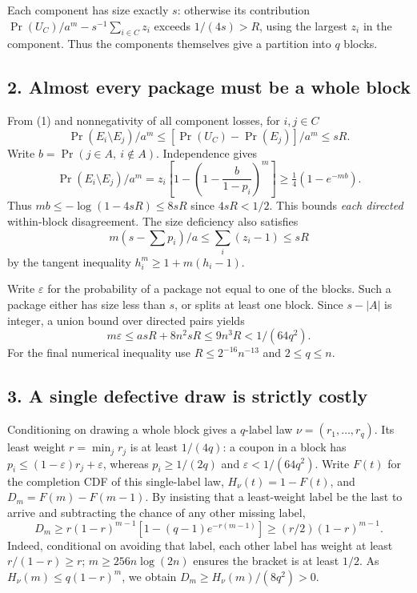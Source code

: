 \documentclass[10pt]{article}
\begin{document}
Each component has size exactly \(s\): otherwise its contribution
\(\Pr(U_C)/a^m-s^{-1}\sum_{i\in C}z_i\) exceeds \(1/(4s)>R\), using the
largest \(z_i\) in the component. Thus the components themselves give a
partition into \(q\) blocks.

\subsection*{2. Almost every package must be a whole
block}\label{almost-every-package-must-be-a-whole-block}

From (1) and nonnegativity of all component losses, for \(i,j\in C\) \[
\Pr(E_i\setminus E_j)/a^m\le [\Pr(U_C)-\Pr(E_j)]/a^m\le sR.
\] Write \(b=\Pr(j\in A,\ i\notin A)\). Independence gives \[
\Pr(E_i\setminus E_j)/a^m
=z_i\left[1-\left(1-\frac b{1-p_i}\right)^m\right]
\ge\tfrac14(1-e^{-mb}).
\] Thus \(mb\le-\log(1-4sR)\le8sR\) since \(4sR<1/2\). This bounds
\emph{each directed} within-block disagreement. The size deficiency also
satisfies \[
m(s-\sum p_i)/a\le \sum_i(z_i-1)\le sR
\] by the tangent inequality \(h_i^m\ge1+m(h_i-1)\).

Write \(\varepsilon\) for the probability of a package not equal to one
of the blocks. Such a package either has size less than \(s\), or splits
at least one block. Since \(s-|A|\) is integer, a union bound over
directed pairs yields \[
m\varepsilon\le asR+8n^2sR\le9 n^3R<1/(64q^2). \tag{2}
\] For the final numerical inequality use \(R\le2^{-16}n^{-13}\) and
\(2\le q\le n\).

\subsection*{3. A single defective draw is strictly
costly}\label{a-single-defective-draw-is-strictly-costly}

Conditioning on drawing a whole block gives a \(q\)-label law
\(\nu=(r_1,\ldots,r_q)\). Its least weight \(r=\min_j r_j\) is at least
\(1/(4q)\): a coupon in a block has
\(p_i\le(1-\varepsilon)r_j+\varepsilon\), whereas \(p_i\ge1/(2q)\) and
\(\varepsilon<1/(64q^2)\). Write \(F(t)\) for the completion CDF of this
single-label law, \(H_\nu(t)=1-F(t)\), and \(D_m=F(m)-F(m-1)\). By
insisting that a least-weight label be the last to arrive and
subtracting the chance of any other missing label, \[
D_m\ge r(1-r)^{m-1}
[1-(q-1)e^{-r(m-1)}]\ge(r/2)(1-r)^{m-1}.
\] Indeed, conditional on avoiding that label, each other label has
weight at least \(r/(1-r)\ge r\); \(m\ge256n\log(2n)\) ensures the
bracket is at least \(1/2\). As \(H_\nu(m)\le q(1-r)^m\), we obtain
\(D_m\ge H_\nu(m)/(8q^2)>0\).
\end{document}
